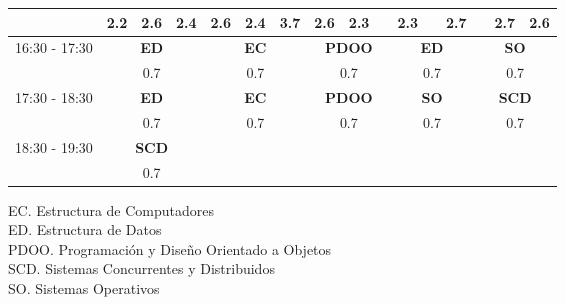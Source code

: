 \documentclass[10pt,spanish, landscape]{article}
\begin{document}
\begin{minipage}{0.7\textwidth}
\begin{tabular}{|c|ccc|ccc|ccc|ccc|ccc|}
 & {\footnotesize 2.2} & {\footnotesize 2.6} & {\footnotesize 2.4} & {\footnotesize 2.6} & {\footnotesize 2.4} & {\footnotesize 3.7} & {\footnotesize 2.6} & {\footnotesize 2.3} & {\footnotesize } & {\footnotesize 2.3} & {\footnotesize } & {\footnotesize 2.7} & {\footnotesize } & {\footnotesize 2.7} & {\footnotesize 2.6}\\ 
 \hline
\multirow{2}{*}{16:30 - 17:30} & \multicolumn{3}{|c|}{ \cellcolor{grisclaro} \textbf{ED}}& \multicolumn{3}{|c|}{ \cellcolor{grisclaro} \textbf{EC}}& \multicolumn{3}{|c|}{ \cellcolor{grisclaro} \textbf{PDOO}}& \multicolumn{3}{|c|}{ \cellcolor{grisclaro} \textbf{ED}}& \multicolumn{3}{|c|}{ \cellcolor{grisclaro} \textbf{SO}}\\ 
& \multicolumn{3}{|c|}{ \cellcolor{grisclaro} {\footnotesize 0.7}}& \multicolumn{3}{|c|}{ \cellcolor{grisclaro} {\footnotesize 0.7}}& \multicolumn{3}{|c|}{ \cellcolor{grisclaro} {\footnotesize 0.7}}& \multicolumn{3}{|c|}{ \cellcolor{grisclaro} {\footnotesize 0.7}}& \multicolumn{3}{|c|}{ \cellcolor{grisclaro} {\footnotesize 0.7}}\\ 
 \hline
\multirow{2}{*}{17:30 - 18:30} & \multicolumn{3}{|c|}{ \cellcolor{grisclaro} \textbf{ED}}& \multicolumn{3}{|c|}{ \cellcolor{grisclaro} \textbf{EC}}& \multicolumn{3}{|c|}{ \cellcolor{grisclaro} \textbf{PDOO}}& \multicolumn{3}{|c|}{ \cellcolor{grisclaro} \textbf{SO}}& \multicolumn{3}{|c|}{ \cellcolor{grisclaro} \textbf{SCD}}\\ 
& \multicolumn{3}{|c|}{ \cellcolor{grisclaro} {\footnotesize 0.7}}& \multicolumn{3}{|c|}{ \cellcolor{grisclaro} {\footnotesize 0.7}}& \multicolumn{3}{|c|}{ \cellcolor{grisclaro} {\footnotesize 0.7}}& \multicolumn{3}{|c|}{ \cellcolor{grisclaro} {\footnotesize 0.7}}& \multicolumn{3}{|c|}{ \cellcolor{grisclaro} {\footnotesize 0.7}}\\ 
 \hline
\multirow{2}{*}{18:30 - 19:30} & \multicolumn{3}{|c|}{ \cellcolor{grisclaro} \textbf{SCD}} &  &  &  &  &  &  &  &  &  &  &  & \\ 
& \multicolumn{3}{|c|}{ \cellcolor{grisclaro} {\footnotesize 0.7}} &  &  &  &  &  &  &  &  &  &  &  & \\ 
 \hline

\end{tabular}
\end{minipage}
\begin{minipage}{0.25\textwidth}
EC. Estructura de Computadores\\[0.5cm]
ED. Estructura de Datos\\[0.5cm]
PDOO. Programación y Diseño Orientado a Objetos\\[0.5cm]
SCD. Sistemas Concurrentes y Distribuidos\\[0.5cm]
SO. Sistemas Operativos\\[0.5cm]
\end{minipage}
\newpage
\end{document}
